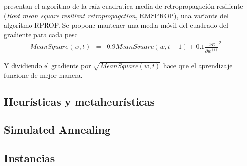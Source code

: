  presentan el algoritmo de la raíz cuadratica media de retropropagación resiliente ({\em Root mean square resilient retropropagation}, RMSPROP), una variante  del algoritmo RPROP. Se propone mantener una media móvil del cuadrado del gradiente para cada peso
\begin{eqnarray}
	MeanSquare(w, t) &=& 0.9MeanSquare(w, t - 1) + 0.1\frac{\partial E}{\partial w^{(t)}}^{2}
\end{eqnarray}

Y dividiendo el gradiente por $\sqrt{MeanSquare(w, t)}$ hace que el aprendizaje funcione de mejor manera.


\subsection{Heurísticas y metaheurísticas}
\subsection{Simulated Annealing}
\subsection{Instancias}
